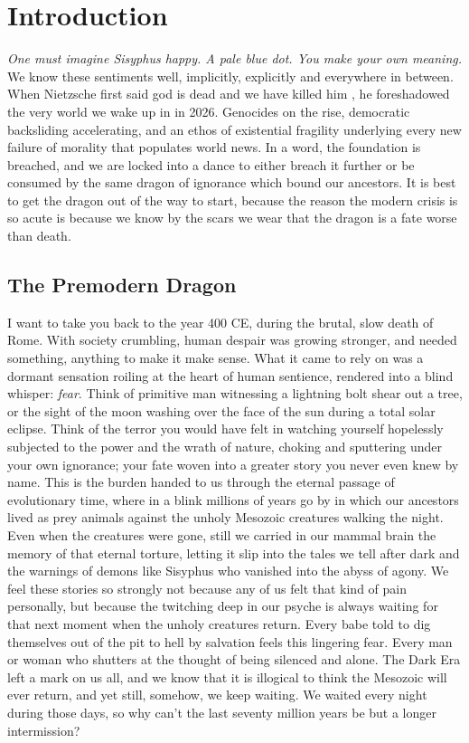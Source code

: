 ﻿%
\section{Introduction}


\textit{One must imagine Sisyphus happy. A pale blue dot. You make your own meaning.} We know these sentiments well, implicitly, explicitly and everywhere in between. When Nietzsche first said god is dead and we have killed him \cite{nietzsche1974gay}, he foreshadowed the very world we wake up in in 2026. Genocides on the rise, democratic backsliding accelerating, and an ethos of existential fragility underlying every new failure of morality that populates world news. In a word, the foundation is breached, and we are locked into a dance to either breach it further or be consumed by the same dragon of ignorance which bound our ancestors. It is best to get the dragon out of the way to start, because the reason the modern crisis is so acute is because we know by the scars we wear that the dragon is a fate worse than death. 


\subsection{The Premodern Dragon}


I want to take you back to the year 400 CE, during the brutal, slow death of Rome. With society crumbling, human despair was growing stronger, and needed something, anything to make it make sense. What it came to rely on was a dormant sensation roiling at the heart of human sentience, rendered into a blind whisper: \textit{fear}. Think of primitive man witnessing a lightning bolt shear out a tree, or the sight of the moon washing over the face of the sun during a total solar eclipse. Think of the terror you would have felt in watching yourself hopelessly subjected to the power and the wrath of nature, choking and sputtering under your own ignorance; your fate woven into a greater story you never even knew by name. This is the burden handed to us through the eternal passage of evolutionary time, where in a blink millions of years go by in which our ancestors lived as prey animals against the unholy Mesozoic creatures walking the night. Even when the creatures were gone, still we carried in our mammal brain the memory of that eternal torture, letting it slip into the tales we tell after dark and the warnings of demons like Sisyphus who vanished into the abyss of agony. We feel these stories so strongly not because any of us felt that kind of pain personally, but because the twitching deep in our psyche is always waiting for that next moment when the unholy creatures return. Every babe told to dig themselves out of the pit to hell by salvation feels this lingering fear. Every man or woman who shutters at the thought of being silenced and alone. The Dark Era left a mark on us all, and we know that it is illogical to think the Mesozoic will ever return, and yet still, somehow, we keep waiting. We waited every night during those days, so why can't the last seventy million years be but a longer intermission? 


